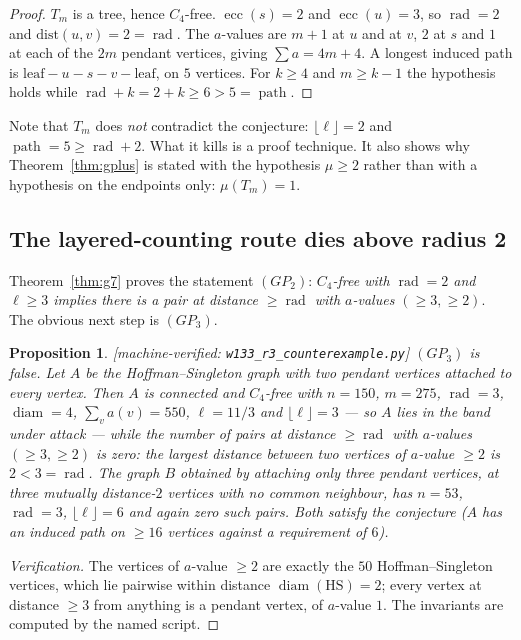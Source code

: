 \documentclass[11pt]{article}
\theoremstyle{plain}
\newtheorem{proposition}[theorem]{Proposition}
\theoremstyle{definition}
\theoremstyle{remark}
\numberwithin{equation}{section}
\newcommand{\rad}{\operatorname{rad}}
\newcommand{\ecc}{\operatorname{ecc}}
\newcommand{\diam}{\operatorname{diam}}
\newcommand{\pth}{\operatorname{path}}
\newcommand{\statusbox}[1]{{\small\sloppy\textsf{[#1]}}}
\newcommand{\MV}[1]{\statusbox{machine-verified: \texttt{#1}}}
\begin{document}
\begin{proof}
$T_m$ is a tree, hence $C_4$-free. $\ecc(s) = 2$ and $\ecc(u) = 3$, so $\rad = 2$ and
$\mathrm{dist}(u,v) = 2 = \rad$. The $a$-values are $m+1$ at $u$ and at $v$, $2$ at $s$ and
$1$ at each of the $2m$ pendant vertices, giving $\sum a = 4m+4$. A longest induced path is
$\text{leaf} - u - s - v - \text{leaf}$, on $5$ vertices. For $k \ge 4$ and $m \ge k-1$ the
hypothesis holds while $\rad + k = 2+k \ge 6 > 5 = \pth$.
\end{proof}

Note that $T_m$ does \emph{not} contradict the conjecture: $\lfloor \ell\rfloor = 2$ and
$\pth = 5 \ge \rad + 2$. What it kills is a proof technique. It also shows why
Theorem~\ref{thm:gplus} is stated with the hypothesis $\mu \ge 2$ rather than with a
hypothesis on the endpoints only: $\mu(T_m) = 1$.

\subsection{The layered-counting route dies above radius 2}

Theorem~\ref{thm:g7} proves the statement $(GP_2)$: \emph{$C_4$-free with $\rad = 2$ and
$\ell \ge 3$ implies there is a pair at distance $\ge \rad$ with $a$-values
$(\ge 3, \ge 2)$}. The obvious next step is $(GP_3)$.

\begin{proposition}\label{prop:gp3}
\MV{w133\_r3\_counterexample.py}
$(GP_3)$ is false. Let $A$ be the Hoffman--Singleton graph with two pendant vertices attached
to every vertex. Then $A$ is connected and $C_4$-free with $n = 150$, $m = 275$, $\rad = 3$,
$\diam = 4$, $\sum_v a(v) = 550$, $\ell = 11/3$ and $\lfloor \ell\rfloor = 3$ --- so $A$ lies
in the band under attack --- while the number of pairs at distance $\ge \rad$ with $a$-values
$(\ge 3,\ge 2)$ is \emph{zero}: the largest distance between two vertices of $a$-value
$\ge 2$ is $2 < 3 = \rad$. The graph $B$ obtained by attaching only three pendant vertices,
at three mutually distance-$2$ vertices with no common neighbour, has $n = 53$, $\rad = 3$,
$\lfloor\ell\rfloor = 6$ and again zero such pairs. Both satisfy the conjecture ($A$ has an
induced path on $\ge 16$ vertices against a requirement of $6$).
\end{proposition}

\begin{proof}[Verification]
The vertices of $a$-value $\ge 2$ are exactly the $50$ Hoffman--Singleton vertices, which lie
pairwise within distance $\diam(\mathrm{HS}) = 2$; every vertex at distance $\ge 3$ from
anything is a pendant vertex, of $a$-value $1$. The invariants are computed by the named
script.
\end{proof}
\end{document}

